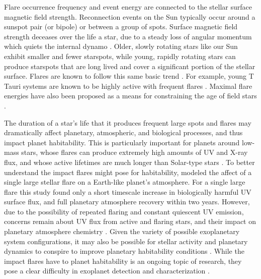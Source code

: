 \documentclass[twocolumn]{aastex6}
\begin{document}
Flare occurrence frequency and event energy are connected to the stellar surface magnetic field strength. Reconnection events on the Sun typically occur around a sunspot pair (or bipole) or between a group of spots. Surface magnetic field strength deceases over the life a star, due to a steady loss of angular momentum which quiets the internal dynamo \citep{skumanich1972}. Older, slowly rotating stars like our Sun exhibit smaller and fewer starspots, while young, rapidly rotating stars can produce starspots that are long lived and cover a significant portion of the stellar surface. Flares are known to follow this same basic trend \citep{ambartsumian1975}. For example, young T Tauri systems are known to be highly active with frequent flares \citep{haro1957}. Maximal flare energies have also been proposed as a means for constraining the age of field stars \citep[e.g.][]{parsamyan1976,parsamyan1995}.


The duration of a star's life that it produces frequent large spots and flares may dramatically affect planetary, atmospheric, and biological processes, and thus impact planet habitability. This is particularly important for planets around low-mass stars, whose flares can produce extremely high amounts of UV and X-ray flux, and whose active lifetimes are much longer than Solar-type stars \citep{west2008}. To better understand the impact flares might pose for habitability, \citet{segura2010} modeled the affect of a single large stellar flare on a Earth-like planet's atmosphere. For a single large flare this study found only a short timescale increase in biologically harmful UV surface flux, and full planetary atmosphere recovery within two years. However, due to the possibility of repeated flaring and constant quiescent UV emission, concerns remain about UV flux from active and flaring stars, and their impact on planetary atmosphere chemistry \citep{france2014}. Given the variety of possible exoplanetary system configurations, it may also be possible for stellar activity and planetary dynamics to conspire to improve planetary  habitability conditions \citep{luger2015}. While the impact flares have to planet habitability is an ongoing topic of research, they pose a clear difficulty in exoplanet detection and characterization \citep{poppenhaeger2015}.
\end{document}
